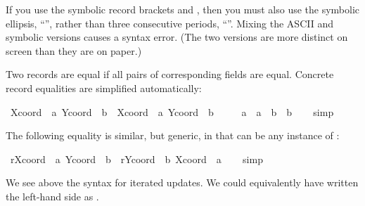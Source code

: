 \begin{isabellebody}
\endisatagproof
{\isafoldproof}%
%
\isadelimproof
%
\endisadelimproof
%
\begin{isamarkuptext}%
\begin{warn}
  If you use the symbolic record brackets \isa{{\isasymlparr}} and \isa{{\isasymrparr}},
  then you must also use the symbolic ellipsis, ``\isa{{\isasymdots}}'', rather
  than three consecutive periods, ``\isa{{\isachardot}{\isachardot}{\isachardot}}''.  Mixing the ASCII
  and symbolic versions causes a syntax error.  (The two versions are
  more distinct on screen than they are on paper.)
  \end{warn}%
\end{isamarkuptext}%
\isamarkuptrue%
%
\isamarkuptrue%
%
\begin{isamarkuptext}%
Two records are equal if all pairs of
  corresponding fields are equal.  Concrete record equalities are
  simplified automatically:%
\end{isamarkuptext}%
\isamarkuptrue%
\isamarkupfalse%
\ {\isachardoublequoteopen}{\isacharparenleft}{\isasymlparr}Xcoord\ {\isacharequal}\ a{\isacharcomma}\ Ycoord\ {\isacharequal}\ b{\isasymrparr}\ {\isacharequal}\ {\isasymlparr}Xcoord\ {\isacharequal}\ a{\isacharprime}{\isacharcomma}\ Ycoord\ {\isacharequal}\ b{\isacharprime}{\isasymrparr}{\isacharparenright}\ {\isacharequal}\isanewline
\ \ \ \ {\isacharparenleft}a\ {\isacharequal}\ a{\isacharprime}\ {\isasymand}\ b\ {\isacharequal}\ b{\isacharprime}{\isacharparenright}{\isachardoublequoteclose}\isanewline
%
\isadelimproof
\ \ %
\endisadelimproof
%
\isatagproof
{}\isamarkupfalse%
\ simp%
\endisatagproof
{\isafoldproof}%
%
\isadelimproof
%
\endisadelimproof
%
\begin{isamarkuptext}%
The following equality is similar, but generic, in that 
  can be any instance of :%
\end{isamarkuptext}%
\isamarkuptrue%
\isamarkupfalse%
\ {\isachardoublequoteopen}r{\isasymlparr}Xcoord\ {\isacharcolon}{\isacharequal}\ a{\isacharcomma}\ Ycoord\ {\isacharcolon}{\isacharequal}\ b{\isasymrparr}\ {\isacharequal}\ r{\isasymlparr}Ycoord\ {\isacharcolon}{\isacharequal}\ b{\isacharcomma}\ Xcoord\ {\isacharcolon}{\isacharequal}\ a{\isasymrparr}{\isachardoublequoteclose}\isanewline
%
\isadelimproof
\ \ %
\endisadelimproof
%
\isatagproof
{}\isamarkupfalse%
\ simp%
\endisatagproof
{\isafoldproof}%
%
\isadelimproof
%
\endisadelimproof
%
\begin{isamarkuptext}%
\noindent
  We see above the syntax for iterated updates.  We could equivalently
  have written the left-hand side as .


\end{isamarkuptext}
\end{isabellebody}
